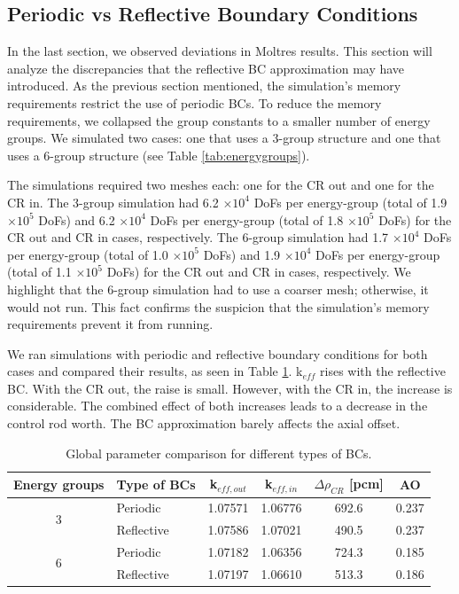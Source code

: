 \subsection{Periodic vs Reflective Boundary Conditions}
\label{sec:bench-bcs}

In the last section, we observed deviations in Moltres results.
This section will analyze the discrepancies that the reflective \gls{BC} approximation may have introduced.
As the previous section mentioned, the simulation's memory requirements restrict the use of periodic BCs.
To reduce the memory requirements, we collapsed the group constants to a smaller number of energy groups.
We simulated two cases: one that uses a 3-group structure and one that uses a 6-group structure (see Table \ref{tab:energygroups}).

The simulations required two meshes each: one for the CR out and one for the CR in.
The 3-group simulation had 6.2 $\times 10^4$ DoFs per energy-group (total of 1.9 $\times 10^5$ DoFs) and 6.2 $\times 10^4$ DoFs per energy-group (total of 1.8 $\times 10^5$ DoFs) for the CR out and CR in cases, respectively.
The 6-group simulation had 1.7 $\times 10^4$ DoFs per energy-group (total of 1.0 $\times 10^5$ DoFs) and 1.9 $\times 10^4$ DoFs per energy-group (total of 1.1 $\times 10^5$ DoFs) for the CR out and CR in cases, respectively.
We highlight that the 6-group simulation had to use a coarser mesh; otherwise, it would not run.
This fact confirms the suspicion that the simulation's memory requirements prevent it from running.

We ran simulations with periodic and reflective boundary conditions for both cases and compared their results, as seen in Table \ref{tab:benchmark-bc}.
k$_{eff}$ rises with the reflective BC.
With the CR out, the raise is small.
However, with the CR in, the increase is considerable.
The combined effect of both increases leads to a decrease in the control rod worth.
The BC approximation barely affects the axial offset.

\begin{table}[htbp!]
  \centering
  \caption{Global parameter comparison for different types of BCs.}
  \begin{tabular}{clcccc}
  \toprule
  Energy groups       & Type of BCs & k$_{eff, out}$ & k$_{eff, in}$ & $\Delta \rho_{CR}$ [pcm] & AO \\
  \midrule
  \multirow{2}{*}{3}  & Periodic     & 1.07571		& 1.06776		& 692.6		& 0.237		\\
                      & Reflective   & 1.07586	  & 1.07021   & 490.5		& 0.237	  \\ \hline
  \multirow{2}{*}{6}  & Periodic     & 1.07182		& 1.06356		& 724.3	  & 0.185  	\\
                      & Reflective   & 1.07197   	& 1.06610 	& 513.3		& 0.186		\\  
  \bottomrule
  \end{tabular}
  \label{tab:benchmark-bc}
\end{table}


